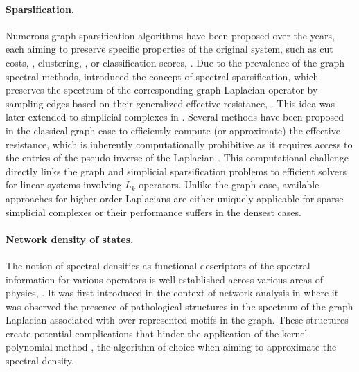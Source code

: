 \paragraph{Sparsification.}

Numerous graph sparsification algorithms have been proposed over the years, each aiming to preserve specific properties of the original system, such as cut costs, \cite{benczur1996approximating,ahn2012graph}, clustering, \cite{satuluri2011local}, or classification scores, \cite{li2022graph}. Due to the prevalence of the graph spectral methods, \cite{spielman2008graph,spielman2011spectral} introduced the concept of spectral sparsification, which preserves the spectrum of the corresponding graph Laplacian operator by sampling edges based on their generalized effective resistance, \cite{tetali1991random}. This idea was later extended to simplicial complexes in \cite{osting2017spectral}. Several methods have been proposed in the classical graph case to efficiently compute (or approximate) the effective resistance, which is inherently computationally prohibitive as it requires access to the entries of the pseudo-inverse of the Laplacian \cite{spielman2014nearly, cohen2014solving}. This computational challenge directly links the graph and simplicial sparsification problems to efficient solvers for linear systems involving \( L_k \) operators. Unlike the graph case, available approaches for higher-order Laplacians\cite{savostianov2024cholesky,cohen2014solving2,kyng2016approximate} are either uniquely applicable for sparse simplicial complexes or their performance suffers in the densest cases. 


\paragraph{Network density of states.}

The notion of spectral densities as functional descriptors of the spectral information for various operators is well-established across various areas of physics, \cite{weisse2006kernel}. It was first introduced in the context of network analysis in \cite{dong2019network} where it was observed the presence of pathological structures in the spectrum of the graph Laplacian associated with over-represented motifs in the graph. These structures create potential complications that hinder the application of the kernel polynomial method \cite{weisse2006kernel}, the algorithm of choice when aiming to approximate the spectral density.




